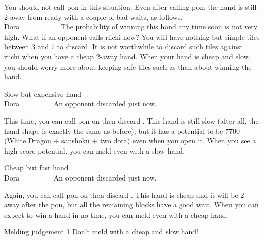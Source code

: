 \bigskip
You should not call {\jap pon} in this situation. Even after calling {\jap pon}, the hand is still 2-away from ready with a couple of bad waits, as follows.
\bp
{}~\rbai\bai\bai~~\\
\hfill\footnotesize{{\jap Dora}~~~~~~~~~~~}
\ep
The probability of winning this hand any time soon is not very high. What if an opponent calls riichi now? You will have nothing but simple tiles between 3 and 7 to discard. It is not worthwhile to discard such tiles against riichi when you have a cheap 2-away hand. When your hand is cheap and slow, you should worry more about keeping safe tiles such as {\LARGE\bai} than about winning the hand.

\newpage
\begin{itembox}[r]{Slow but expensive hand}
\bp
{}\bai\bai~~\\
\hfill\footnotesize{{\jap Dora}~~~~~~~~~}
\ep
\vspace{-15pt}An opponent discarded {\LARGE\bai} just now.
\end{itembox}

\bigskip
This time, you can call {\jap pon} on {\LARGE\bai} then discard {\LARGE{}}. This hand is still slow (after all, the hand shape is exactly the same as before), but it has a potential to be 7700 (White Dragon + {\jap sanshoku} + two {\jap dora}) even when you open it. When you see a high score potential, you can meld even with a slow hand. 

\bigskip
\begin{itembox}[r]{Cheap but fast hand}
\bp
{}\bai\bai~~\\
\hfill\footnotesize{{\jap Dora}~~~~~~~~~}
\ep
\vspace{-15pt}An opponent discarded {\LARGE\bai} just now.
\end{itembox}

\bigskip
Again, you can call {\jap pon} on {\LARGE\bai} then discard {\LARGE{}}. This hand is cheap and it will be 2-away after the {\jap pon}, but all the remaining blocks have a good wait. When you can expect to win a hand in no time, you can meld even with a cheap hand. 

\bigskip
\color{MyRed}
\begin{itembox}[c]{Melding judgement 1}\normalcolor
Don't meld with a cheap and slow hand!
\end{itembox}\normalcolor

